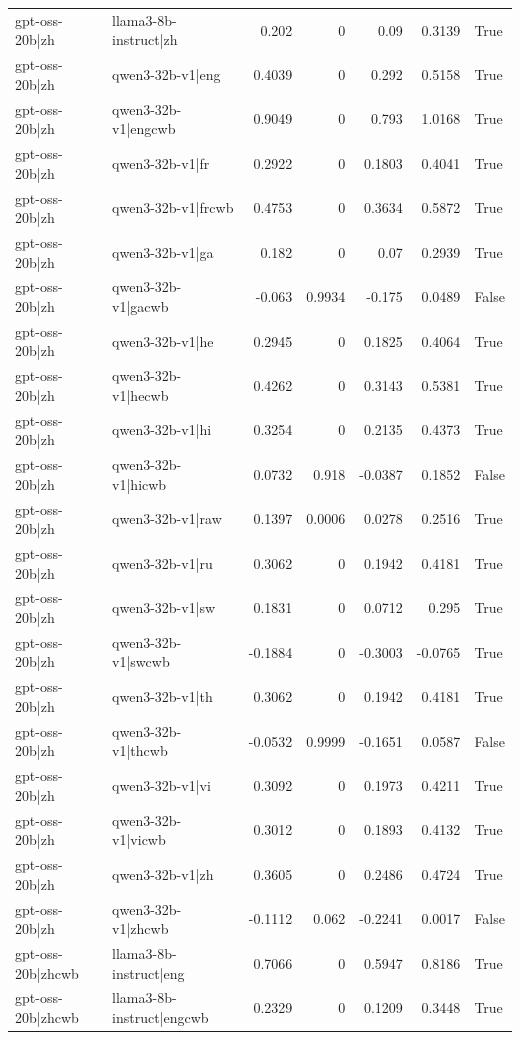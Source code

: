 \begin{table}
\begin{tabular}{l l r r r r l}
gpt-oss-20b|zh & llama3-8b-instruct|zh & 0.202 & 0 & 0.09 & 0.3139 & True \\
gpt-oss-20b|zh & qwen3-32b-v1|eng & 0.4039 & 0 & 0.292 & 0.5158 & True \\
gpt-oss-20b|zh & qwen3-32b-v1|engcwb & 0.9049 & 0 & 0.793 & 1.0168 & True \\
gpt-oss-20b|zh & qwen3-32b-v1|fr & 0.2922 & 0 & 0.1803 & 0.4041 & True \\
gpt-oss-20b|zh & qwen3-32b-v1|frcwb & 0.4753 & 0 & 0.3634 & 0.5872 & True \\
gpt-oss-20b|zh & qwen3-32b-v1|ga & 0.182 & 0 & 0.07 & 0.2939 & True \\
gpt-oss-20b|zh & qwen3-32b-v1|gacwb & -0.063 & 0.9934 & -0.175 & 0.0489 & False \\
gpt-oss-20b|zh & qwen3-32b-v1|he & 0.2945 & 0 & 0.1825 & 0.4064 & True \\
gpt-oss-20b|zh & qwen3-32b-v1|hecwb & 0.4262 & 0 & 0.3143 & 0.5381 & True \\
gpt-oss-20b|zh & qwen3-32b-v1|hi & 0.3254 & 0 & 0.2135 & 0.4373 & True \\
gpt-oss-20b|zh & qwen3-32b-v1|hicwb & 0.0732 & 0.918 & -0.0387 & 0.1852 & False \\
gpt-oss-20b|zh & qwen3-32b-v1|raw & 0.1397 & 0.0006 & 0.0278 & 0.2516 & True \\
gpt-oss-20b|zh & qwen3-32b-v1|ru & 0.3062 & 0 & 0.1942 & 0.4181 & True \\
gpt-oss-20b|zh & qwen3-32b-v1|sw & 0.1831 & 0 & 0.0712 & 0.295 & True \\
gpt-oss-20b|zh & qwen3-32b-v1|swcwb & -0.1884 & 0 & -0.3003 & -0.0765 & True \\
gpt-oss-20b|zh & qwen3-32b-v1|th & 0.3062 & 0 & 0.1942 & 0.4181 & True \\
gpt-oss-20b|zh & qwen3-32b-v1|thcwb & -0.0532 & 0.9999 & -0.1651 & 0.0587 & False \\
gpt-oss-20b|zh & qwen3-32b-v1|vi & 0.3092 & 0 & 0.1973 & 0.4211 & True \\
gpt-oss-20b|zh & qwen3-32b-v1|vicwb & 0.3012 & 0 & 0.1893 & 0.4132 & True \\
gpt-oss-20b|zh & qwen3-32b-v1|zh & 0.3605 & 0 & 0.2486 & 0.4724 & True \\
gpt-oss-20b|zh & qwen3-32b-v1|zhcwb & -0.1112 & 0.062 & -0.2241 & 0.0017 & False \\
gpt-oss-20b|zhcwb & llama3-8b-instruct|eng & 0.7066 & 0 & 0.5947 & 0.8186 & True \\
gpt-oss-20b|zhcwb & llama3-8b-instruct|engcwb & 0.2329 & 0 & 0.1209 & 0.3448 & True \\

\end{tabular}
\end{table}
